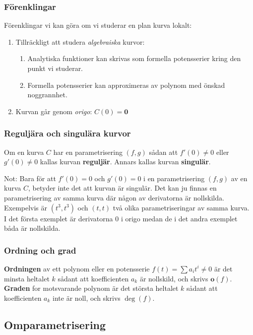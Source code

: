 \documentclass{beamer}
\begin{document}
\begin{frame}
	\frametitle{Förenklingar}
	Förenklingar vi kan göra om vi studerar en plan kurva lokalt:
	
	\begin{enumerate}
		\item<1-> Tillräckligt att studera \emph{algebraiska} kurvor:
		\begin{enumerate}
			\item<2-> Analytiska funktioner kan skrivas som formella potensserier kring den punkt vi studerar.
			\item<3-> Formella potensserier kan approximeras av polynom med önskad noggrannhet.
		\end{enumerate}
		\item<4-> Kurvan går genom \emph{origo}: $C(0) = \mathbf{0}$
	\end{enumerate}
\end{frame}

\begin{frame}
	\frametitle{Reguljära och singulära kurvor}
\begin{Definition}
	Om en kurva $C$ har en parametrisering $(f, g)$ sådan att $f'(0) \neq 0$ eller $g'(0) \neq 0$ kallas kurvan \textbf{reguljär}. Annars kallas kurvan \textbf{singulär}.
\end{Definition}

\vspace{20pt}
\scriptsize Not: Bara för att $f'(0) = 0$ och $g'(0) = 0$ i en parametrisering $(f, g)$ av en kurva $C$, betyder inte det att kurvan är singulär. Det kan ju finnas en parametrisering av samma kurva där någon av derivatorna är nollskilda. Exempelvis är $(t^3, t^3)$ och $(t, t)$ två olika parametriseringar av samma kurva. I det första exemplet är derivatorna $0$ i origo medan de i det andra exemplet båda är nollskilda.
\end{frame}

\begin{frame}
	\frametitle{Ordning och grad}
\begin{Definition}
	\textbf{Ordningen} av ett polynom eller en potensserie $f(t) =
	\sum a_i t^i \neq 0$ är det minsta heltalet $k$ sådant att koefficienten $a_k$ är nollskild, och skrivs $\mathbf{o}(f)$. \textbf{Graden} for motsvarande polynom är det största heltalet $k$ sådant att koefficienten $a_k$ inte är noll, och skrivs $\deg(f)$.
\end{Definition}
\end{frame}

\subsection{Omparametrisering}
\end{document}

